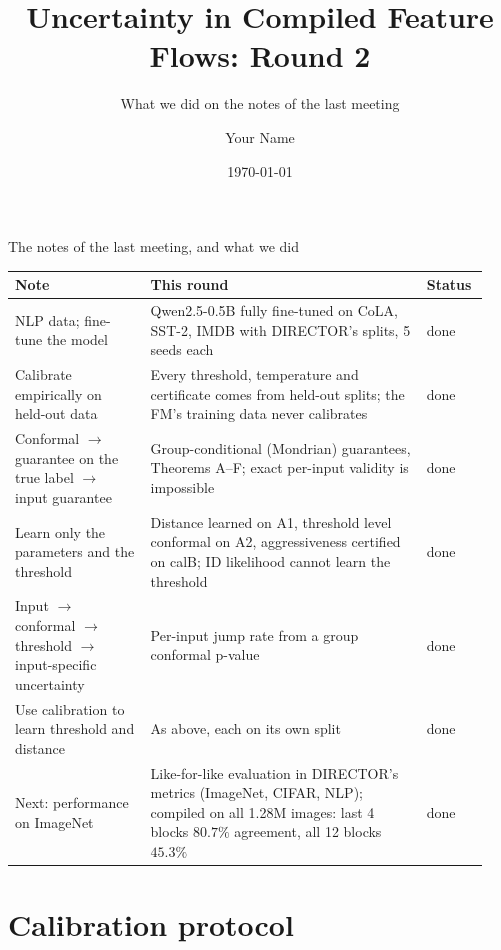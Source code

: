 \documentclass[aspectratio=169,11pt]{beamer}
\title{Uncertainty in Compiled Feature Flows: Round 2}
\subtitle{What we did on the notes of the last meeting}
\author{Your Name}
\institute{Progress report, meeting with Prof.~Nghia}
\date{\today}
\begin{document}
\maketitle

\begin{frame}{The notes of the last meeting, and what we did}
  \footnotesize
  \begin{tabular}{@{}p{0.27\linewidth}p{0.55\linewidth}p{0.12\linewidth}@{}}
    \toprule
    Note & This round & Status\\
    \midrule
    NLP data; fine-tune the model & Qwen2.5-0.5B fully fine-tuned on CoLA, SST-2, IMDB with DIRECTOR's splits, 5 seeds each & done\\
    Calibrate empirically on held-out data & Every threshold, temperature and certificate comes from held-out splits; the FM's training data never calibrates & done\\
    Conformal $\to$ guarantee on the true label $\to$ input guarantee & Group-conditional (Mondrian) guarantees, Theorems A--F; exact per-input validity is impossible & done\\
    Learn only the parameters and the threshold & Distance learned on A1, threshold level conformal on A2, aggressiveness certified on calB; ID likelihood cannot learn the threshold & done\\
    Input $\to$ conformal $\to$ threshold $\to$ input-specific uncertainty & Per-input jump rate from a group conformal p-value & done\\
    Use calibration to learn threshold and distance & As above, each on its own split & done\\
    Next: performance on ImageNet & Like-for-like evaluation in DIRECTOR's metrics (ImageNet, CIFAR, NLP); compiled on all 1.28M images: last 4 blocks $80.7\%$ agreement, all 12 blocks $45.3\%$ & done\\
    \bottomrule
  \end{tabular}
\end{frame}

\section{Calibration protocol}
\end{document}
